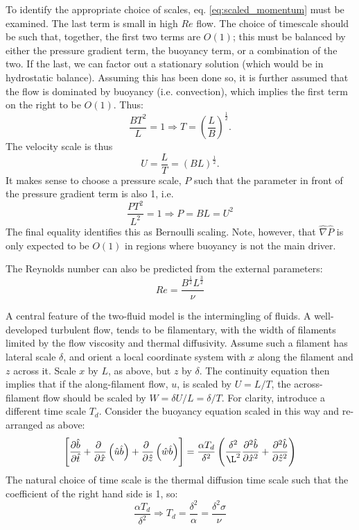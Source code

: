 \documentclass[a4paper,10pt]{article}
\begin{document}
To identify the appropriate choice of scales, eq. \eqref{eq:scaled_momentum} must be examined.
The last term is small in high $Re$ flow. 
The choice of timescale should be such that, together, the first two terms are $O(1)$; this must be balanced by either the pressure gradient term, the buoyancy term, or a combination of the two. 
If the last, we can factor out a stationary solution (which would be in hydrostatic balance).
Assuming this has been done so, it is further assumed that the flow is dominated by buoyancy (i.e. convection), which implies the first term on the right to be $O(1)$. 
Thus:
\begin{equation}
\frac{BT^2}{L}=1 \Rightarrow T = \left(\frac{L}{B}\right)^{\frac{1}{2}}.
\label{eq:T_scale}
\end{equation} 
The velocity scale is thus
\begin{equation}
U = \frac{L}{T} = \left(BL\right)^{\frac{1}{2}}.
\end{equation}
It makes sense to choose a pressure scale, $P$ such that the parameter in front of the pressure gradient term is also 1, i.e.
\begin{equation}
\frac{PT^2}{L^2}=1 \Rightarrow P = B L = U^2
\end{equation}
The final equality identifies this as Bernoulli scaling.
Note, however, that $\hat{\nabla}\hat{P}$ is only expected to be $O(1)$ in regions where buoyancy is not the main driver.

The Reynolds number can also be predicted from the external parameters:
\begin{equation}
Re=\frac{B^{\frac{1}{2}}L^{\frac{3}{2}}}{\nu}
\end{equation}

A central feature of the two-fluid model is the intermingling of fluids. 
A well-developed turbulent flow, tends to be filamentary, with the width of filaments limited by the flow viscosity and thermal diffusivity.
Assume such a filament has lateral scale $\delta$, and orient a local coordinate system with $x$ along the filament and $z$ across it. 
Scale $x$ by $L$, as above, but $z$ by $\delta$.
The continuity equation then implies that if the along-filament flow, $u$, is scaled by $U=L/T$, the across-filament flow should be scaled by $W=\delta U / L = \delta / T$.
For clarity, introduce a different time scale $T_d$.
Consider the buoyancy equation scaled in this way and re-arranged as above:
\begin{equation}
\left[\frac{\partial \hat{b} }{\partial \hat{t}} +
\frac{\partial ~}{\partial \hat{x}}\left(\hat{u} \hat{b}\right) 
+ \frac{\partial ~}{\partial\hat{z}}\left(\hat{w} \hat{b}\right)
\right] =
\frac{\alpha T_d}{\delta^2}
\left(\frac{\delta^2}{\L^2} \frac{\partial^2 \hat{b}}{\partial \hat{x}^2} + \frac{\partial^2 \hat{b}}{\partial \hat{z}^2} \right)
\end{equation}
The natural choice of time scale is the thermal diffusion time scale such that the coefficient of the right hand side is 1, so:
\begin{equation}
\frac{\alpha T_d}{\delta^2} \Rightarrow T_d = \frac{\delta^2}{\alpha}=\frac{\delta^2\sigma}{\nu}
\end{equation}
\end{document}
